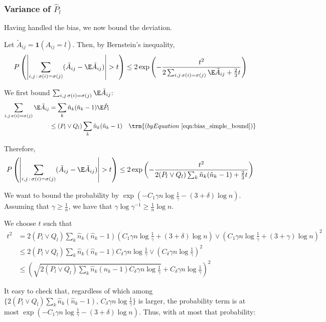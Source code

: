 \documentclass{article}
\begin{document}
\subsubsection{Variance of $\hat{P}_l$}

Having handled the bias, we now bound the deviation.

Let $\tilde{A}_{ij} = \mathbf{1}(A_{ij} = l)$. Then, by Bernstein's inequality,
\[
P\left( \left| \sum_{i,j\,:\, \sigma(i) = \sigma(j)} (\tilde{A}_{ij} - \E \tilde{A}_{ij} ) \right|  > t 
 \right) \leq 2 \exp\left( 
    - \frac{t^2}{ 2 \sum_{i,j \, \sigma(i) = \sigma(j)} \E \tilde{A}_{ij}  + \frac{2}{3}t } 
\right)
\]

We first bound $\sum_{i,j \, \sigma(i) = \sigma(j)} \E \tilde{A}_{ij}$:
\begin{align*}
\sum_{i,j \, \sigma(i) = \sigma(j)} \E \tilde{A}_{ij} &=
  \sum_k \hat{n}_k (\hat{n}_k - 1) \E \hat{P}_l \\
 &\leq (P_l \vee Q_l) \sum_k \hat{n}_k (\hat{n}_k - 1) \quad 
  \trm{(by Equation~\ref{eqn:bias_simple_bound})}
\end{align*}

Therefore,
\[
P\left( \left| \sum_{i,j\,:\, \sigma(i) = \sigma(j)} (\tilde{A}_{ij} - \E \tilde{A}_{ij} ) \right|  > t 
 \right) \leq 2 \exp\left( 
    - \frac{t^2}{ 2 (P_l \vee Q_l) \sum_k \hat{n}_k (\hat{n}_k - 1)  + \frac{2}{3}t } 
\right)
\]

We want to bound the probability by $\exp( - C_1 \gamma n \log \frac{1}{\gamma} - (3+\delta) \log n )$. Assuming that $\gamma \geq \frac{1}{n}$, we have that $\gamma \log \gamma^{-1} \geq \frac{1}{n} \log n$. 

We choose $t$ such that
\begin{align*}
t^2 &= 2 (P_l \vee Q_l) \sum_k \hat{n}_k (\hat{n}_k - 1) \left( 
    C_1 \gamma n \log \frac{1}{\gamma} + (3+\delta) \log n \right) \vee 
   \left( C_1 \gamma n \log \frac{1}{\gamma} + (3 + \gamma) \log n \right)^2  \\
 &\leq 2 (P_l \vee Q_l) \sum_k \hat{n}_k (\hat{n}_k - 1) C_{\delta} \gamma n \log \frac{1}{\gamma} \vee \left( C_\delta \gamma n \log \frac{1}{\gamma} \right)^2  \\
 &\leq \left( \sqrt{  2 (P_l \vee Q_l)  \sum_k \hat{n}_k (\hat{n}_k - 1) C_\delta \gamma n \log \frac{1}{\gamma} } + C_\delta \gamma n \log \frac{1}{\gamma} \right)^2
\end{align*}

It easy to check that, regardless of which among $\{ 2 (P_l \vee Q_l) \sum_k \hat{n}_k (\hat{n}_k - 1) ,\, C_\delta \gamma n \log \frac{1}{\gamma} \}$ is larger, the probability term is at most $\exp( - C_1 \gamma n \log \frac{1}{\gamma} - (3+\delta) \log n )$. Thus, with at most that probability:
\end{document}
